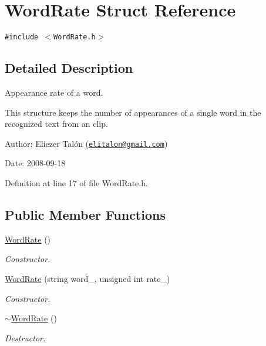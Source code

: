 \hypertarget{struct_word_rate}{
\section{WordRate Struct Reference}
\label{struct_word_rate}
}
{\tt \#include $<$WordRate.h$>$}



\subsection{Detailed Description}
Appearance rate of a word. 

This structure keeps the number of appearances of a single word in the recognized text from an clip.

\begin{Desc}
\item[Author:]Eliezer Talón (\href{mailto:elitalon@gmail.com}{\tt elitalon@gmail.com}) \end{Desc}
\begin{Desc}
\item[Date:]2008-09-18 \end{Desc}


Definition at line 17 of file WordRate.h.\subsection*{Public Member Functions}
\begin{CompactItemize}
\item 
\hyperlink{struct_word_rate_c22aaa0c04769cce44ba08bf5e6eb655}{WordRate} ()
\begin{CompactList}\small\item\em Constructor. \item\end{CompactList}\item 
\hyperlink{struct_word_rate_063a8ee951293c30671f47b1559f6a5b}{WordRate} (string word\_\-, unsigned int rate\_\-)
\begin{CompactList}\small\item\em Constructor. \item\end{CompactList}\item 
\hyperlink{struct_word_rate_a86a63516e4c3d4e8aa9060ea5be6b23}{$\sim$WordRate} ()
\begin{CompactList}\small\item\em Destructor. \item\end{CompactList}\end{CompactItemize}
